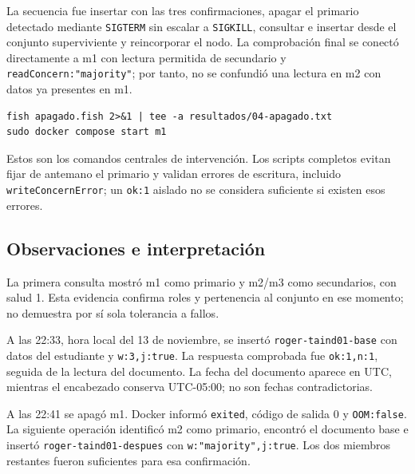 La secuencia fue insertar con las tres confirmaciones, apagar el primario detectado mediante \texttt{SIGTERM} sin escalar a \texttt{SIGKILL}, consultar e insertar desde el conjunto superviviente y reincorporar el nodo. La comprobación final se conectó directamente a m1 con lectura permitida de secundario y \texttt{readConcern:"majority"}; por tanto, no se confundió una lectura en m2 con datos ya presentes en m1.

\begin{lstlisting}
fish apagado.fish 2>&1 | tee -a resultados/04-apagado.txt
sudo docker compose start m1
\end{lstlisting}

Estos son los comandos centrales de intervención. Los scripts completos evitan fijar de antemano el primario y validan errores de escritura, incluido \texttt{writeConcernError}; un \texttt{ok:1} aislado no se considera suficiente si existen esos errores.

\subsection{Observaciones e interpretación}
La primera consulta mostró m1 como primario y m2/m3 como secundarios, con salud 1. Esta evidencia confirma roles y pertenencia al conjunto en ese momento; no demuestra por sí sola tolerancia a fallos.

A las 22:33, hora local del 13 de noviembre, se insertó \texttt{roger-taind01-base} con datos del estudiante y \texttt{w:3,j:true}. La respuesta comprobada fue \texttt{ok:1,n:1}, seguida de la lectura del documento. La fecha del documento aparece en UTC, mientras el encabezado conserva UTC-05:00; no son fechas contradictorias.

A las 22:41 se apagó m1. Docker informó \texttt{exited}, código de salida 0 y \texttt{OOM:false}. La siguiente operación identificó m2 como primario, encontró el documento base e insertó \texttt{roger-taind01-despues} con \texttt{w:"majority",j:true}. Los dos miembros restantes fueron suficientes para esa confirmación.


